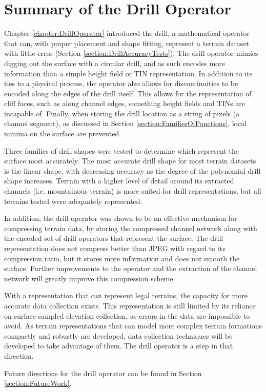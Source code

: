 % 
% 
% 
% 


\section{Summary of the Drill Operator}

Chapter \ref{chapter:DrillOperator} introduced the drill, a mathematical operator that can, with proper placement and shape fitting, represent a terrain dataset with little error (Section \ref{section:DrillAccuracyTests}). 
The drill operator mimics digging out the surface with a circular drill, and as such encodes more information than a simple height field or TIN representation. In addition to its ties to a physical process, the operator also allows for discontinuities to be encoded along the edges of the drill itself. This allows for the representation of cliff faces, such as along channel edges, something height fields and TINs are incapable of. Finally, when storing the drill location as a string of pixels (a channel segment), as discussed in Section \ref{section:FamiliesOfFunctions}, local minima on the surface are prevented.

Three families of drill shapes were tested to determine which represent the surface most accurately. The most accurate drill shape for most terrain datasets is the linear shape, with decreasing accuracy as the degree of the polynomial drill shape increases. Terrain with a higher level of detail around its extracted channels (i.e. mountainous terrain) is more suited for drill representations, but all terrains tested were adequately represented.

In addition, the drill operator was shown to be an effective mechanism for compressing terrain data, by storing the compressed channel network along with the encoded set of drill operators that represent the surface. The drill representation does not compress better than JPEG with regard to its compression ratio, but it stores more information and does not smooth the surface. Further improvements to the operator and the extraction of the channel network will greatly improve this compression scheme.

With a representation that can represent legal terrains, the capacity for more accurate data collection exists. This representation is still limited by its reliance on surface sampled elevation collection, as errors in the data are impossible to avoid. As terrain representations that can model more complex terrain formations compactly and robustly are developed, data collection techniques will be developed to take advantage of them. The drill operator is a step in that direction.

Future directions for the drill operator can be found in Section \ref{section:FutureWork}.
